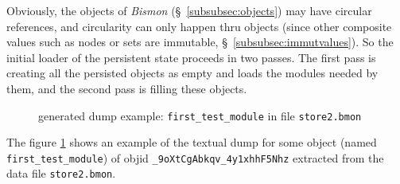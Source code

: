 Obviously, the objects of \emph{Bismon} (§~\ref{subsubsec:objects})
may have circular references, and circularity can only happen thru
objects (since other composite values such as nodes or sets are
immutable, §~\ref{subsubsec:immutvalues}). So the initial loader of
the persistent state proceeds in two passes. The first pass is
creating all the persisted objects as empty and loads the modules
needed by them, and the second pass is filling these objects.

\bigskip

\begin{figure}[h]
\fbox{\parbox{\textwidth}{
\begin{scriptsize}
  
\end{scriptsize}
}}
  \caption{generated dump example: \texttt{first\_test\_module} in file
    \texttt{store2.bmon}}
  \label{fig:objdumpfirsttestmodule}
\end{figure}

\bigskip

The figure \ref{fig:objdumpfirsttestmodule} shows an example of the
textual dump for some object (named \texttt{first\_test\_module}) of
objid {\small\texttt{\_9oXtCgAbkqv\_4y1xhhF5Nhz}} extracted from the
data file \texttt{store2.bmon}.

\medskip

